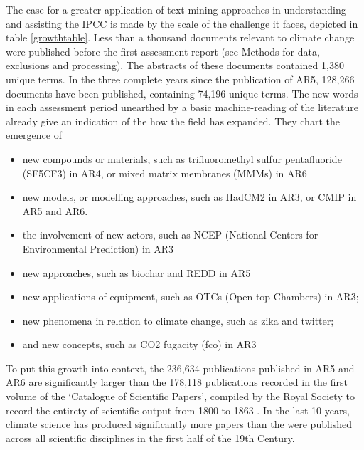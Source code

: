 \documentclass{article}
\begin{document}
\begin{linenumbers}
The case for a greater application of text-mining approaches in understanding and assisting the IPCC is made by the scale of the challenge it faces, depicted in table \ref{growthtable}. Less than a thousand documents relevant to climate change were published before the first assessment report (see Methods for data, exclusions and processing). The abstracts of these documents contained 1,380 unique terms. In the three complete years since the publication of AR5, 128,266 documents have been published, containing 74,196 unique terms. The new words in each assessment period unearthed by a basic machine-reading of the literature already give an indication of the how the field has expanded. They chart the emergence of

\linespread{1}
\begin{itemize}
	\item new compounds or materials, such as trifluoromethyl sulfur pentafluoride (SF5CF3) in AR4, or mixed matrix membranes (MMMs) in AR6
	\item new models, or modelling approaches, such as HadCM2 in AR3, or CMIP in AR5 and AR6.
	\item the involvement of new actors, such as NCEP (National Centers for Environmental Prediction) in AR3
	\item new approaches, such as biochar and REDD in AR5
	\item new applications of equipment, such as OTCs (Open-top Chambers) in AR3;
	\item new phenomena in relation to climate change, such as zika and twitter;
	\item and new concepts, such as CO2 fugacity (fco) in AR3
\end{itemize}
\linespread{1.5}




To put this growth into context, the 236,634 publications published in AR5 and AR6 are significantly larger than the 178,118 publications recorded in the first volume of the `Catalogue of Scientific Papers', compiled by the Royal Society to record the entirety of scientific output from 1800 to 1863 \citep{Csiszar2017}. In the last 10 years, climate science has produced significantly more papers than the were published across all scientific disciplines in the first half of the 19th Century.







\end{linenumbers}
\end{document}

